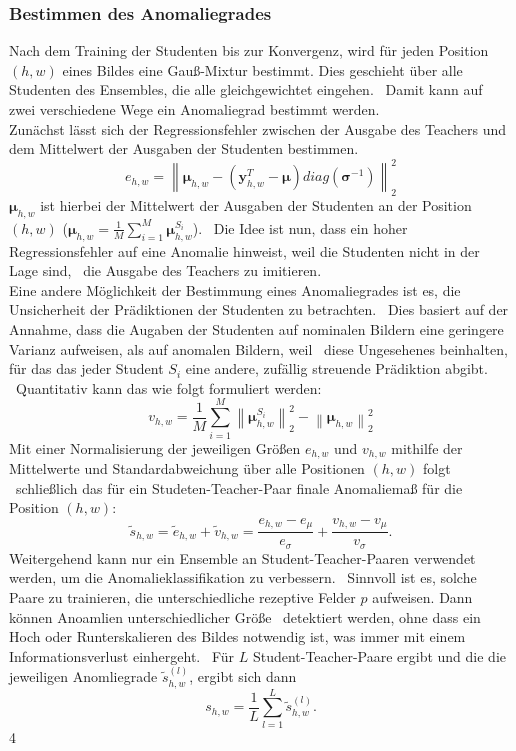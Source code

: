 \subsubsection*{Bestimmen des Anomaliegrades}
Nach dem Training der Studenten bis zur Konvergenz, wird für jeden Position $(h,w)$ eines Bildes eine Gauß-Mixtur bestimmt. Dies geschieht über alle Studenten des Ensembles, die alle gleichgewichtet eingehen. \
Damit kann auf zwei verschiedene Wege ein Anomaliegrad bestimmt werden. \\
Zunächst lässt sich der Regressionsfehler zwischen der Ausgabe des Teachers und dem Mittelwert der Ausgaben der Studenten bestimmen. \
$$
e_{h,w} = \left\lVert \boldsymbol{\mu}_{h,w} - \left(\mathbf{y}_{h,w}^{T}-\boldsymbol{\mu}\right)diag\left(\boldsymbol{\sigma}^{-1}\right) \right\rVert_{2}^{2} 
$$
$\boldsymbol{\mu}_{h,w}$ ist hierbei der Mittelwert der Ausgaben der Studenten an der Position $(h,w)$ ($\boldsymbol{\mu}_{h,w}=\frac{1}{M} \sum_{i=1}^M\boldsymbol{\mu}_{h,w}^{S_i}$). \
Die Idee ist nun, dass ein hoher Regressionsfehler auf eine Anomalie hinweist, weil die Studenten nicht in der Lage sind, \
die Ausgabe des Teachers zu imitieren. \\
Eine andere Möglichkeit der Bestimmung eines Anomaliegrades ist es, die Unsicherheit der Prädiktionen der Studenten zu betrachten. \
Dies basiert auf der Annahme, dass die Augaben der Studenten auf nominalen Bildern eine geringere Varianz aufweisen, als auf anomalen Bildern, weil \
diese Ungesehenes beinhalten, für das das jeder Student $S_{i}$ eine andere, zufällig streuende Prädiktion abgibt. \
Quantitativ kann das wie folgt formuliert werden: \
$$
v_{h,w}=\frac{1}{M} \sum_{i=1}^M\left\|\boldsymbol{\mu}_{h,w}^{S_i}\right\|_2^2-\left\|\boldsymbol{\mu}_{h,w}\right\|_2^2
$$
Mit einer Normalisierung der jeweiligen Größen $e_{h,w}$ und $v_{h,w}$ mithilfe der Mittelwerte und Standardabweichung über alle Positionen $(h,w)$ folgt \
schließlich das für ein Studeten-Teacher-Paar finale Anomaliemaß für die Position $(h,w)$: \
$$
\tilde{s}_{h,w}=\tilde{e}_{h,w}+\tilde{v}_{h,w}=\frac{e_{h,w}-e_\mu}{e_\sigma}+\frac{v_{h,w}-v_\mu}{v_\sigma} .
$$
Weitergehend kann nur ein Ensemble an Student-Teacher-Paaren verwendet werden, um die Anomalieklassifikation zu verbessern. \
Sinnvoll ist es, solche Paare zu trainieren, die unterschiedliche rezeptive Felder $p$ aufweisen. Dann können Anoamlien unterschiedlicher Größe \
detektiert werden, ohne dass ein Hoch oder Runterskalieren des Bildes notwendig ist, was immer mit einem Informationsverlust einhergeht. \
Für $L$ Student-Teacher-Paare ergibt und die die jeweiligen Anomliegrade $\tilde{s}_{h,w}^{(l)}$, ergibt sich dann \
$$
s_{h,w}=\frac{1}{L}\sum_{l=1}^L\tilde{s}_{h,w}^{(l)} .
$$4
